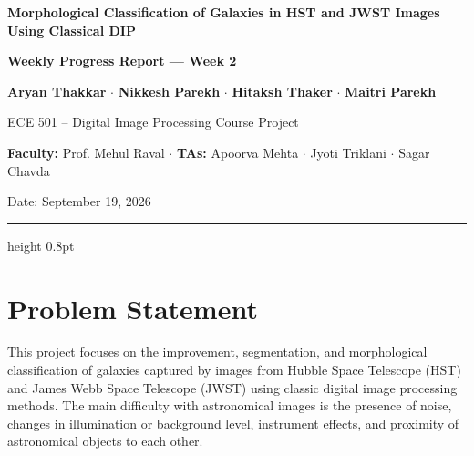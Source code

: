 \documentclass[11pt]{article}
\begin{document}
\thispagestyle{fancy}


\begin{center}

\Large\textbf{Morphological Classification of Galaxies in HST and JWST Images Using Classical DIP}

\vspace{3pt}

\normalsize\textbf{Weekly Progress Report --- Week 2}

\vspace{4pt}

\small
\textbf{Aryan Thakkar}
\quad $\cdot$ \quad
\textbf{Nikkesh Parekh}
\quad $\cdot$ \quad
\textbf{Hitaksh Thaker}
\quad $\cdot$ \quad
\textbf{Maitri Parekh}

\vspace{3pt}

\small ECE 501 -- Digital Image Processing Course Project

\vspace{2pt}

\small\textbf{Faculty:} Prof. Mehul Raval
\quad $\cdot$ \quad
\textbf{TAs:} Apoorva Mehta \quad $\cdot$ \quad Jyoti Triklani \quad $\cdot$ \quad Sagar Chavda

\vspace{3pt}

\small Date: September 19, 2026

\end{center}

\vspace{1pt}
\hrule height 0.8pt
\vspace{3pt}


\section{Problem Statement}

This project focuses on the improvement, segmentation, and morphological classification of galaxies captured by images from Hubble Space Telescope (HST) and James Webb Space Telescope (JWST) using classic digital image processing methods. The main difficulty with astronomical images is the presence of noise, changes in illumination or background level, instrument effects, and proximity of astronomical objects to each other.
\end{document}
